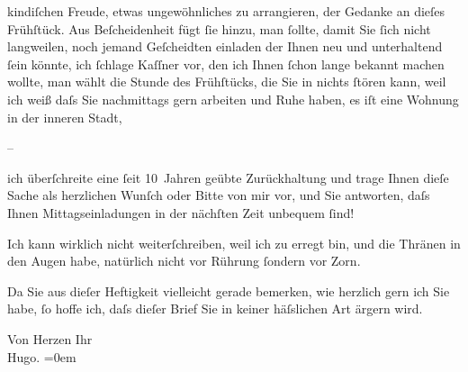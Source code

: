               kindiſchen Freude, etwas ungewöhnliches zu arrangieren, der Gedanke an dieſes
               Frühſtück. Aus Beſcheidenheit fügt{ }ſie hinzu, man{ }ſollte, damit Sie{ }ſich nicht
               langweilen, noch {\pb}jemand
               Geſcheidten einladen der Ihnen neu und unterhaltend{ }ſein könnte, ich{ }ſchlage Kaſſner vor, den ich Ihnen{ }ſchon lange bekannt
               machen wollte, man wählt die Stunde des Frühſtücks, die Sie in nichts{ }ſtören kann,
               weil {\pb}ich weiß daſs Sie
               nachmittags gern arbeiten und Ruhe haben, es iſt eine Wohnung in der inneren Stadt,\pend
           
\pstart
           \numberlinefalse{}–\numberlinetrue{}\pend
           
\pstart
           ich überſchreite eine{ }ſeit 10 Jahren geübte Zurückhaltung und trage Ihnen dieſe Sache
               als herzlichen Wunſch oder Bitte von {\pb}mir vor, und Sie antworten, daſs
               Ihnen Mittagseinladungen in der nächſten Zeit unbequem{ }ſind!\pend
           
\pstart
           Ich kann wirklich nicht weiterſchreiben, weil ich zu erregt bin, und die Thränen in
               den Augen {\pb}habe, natürlich nicht
               vor Rührung{ }ſondern vor Zorn.\pend
           
\pstart
           Da Sie aus dieſer Heftigkeit vielleicht gerade bemerken, wie herzlich gern ich Sie
               habe,{ }ſo hoffe ich, daſs dieſer Brief Sie in keiner häſslichen Art ärgern wird.\pend
           
\pstart
           Von Herzen Ihr{\\[\baselineskip]}\spacefill\mbox{Hugo.}\pend
           \leftskip=0em{}\endnumbering{}  \newcommand{\dateiname}{L01210}\newcommand{\titel}{Hugo von Hofmannsthal an Arthur Schnitzler, [28. 3. 1902]}\newcommand{\editorInnen}{Martin Anton Müller und Gerd-Hermann Susen}
